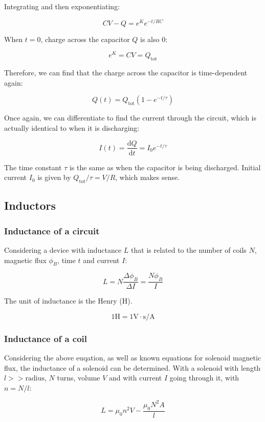 \documentclass[12pt]{article}
\begin{document}
Integrating and then exponentiating:

\[
\boxed{CV - Q = e^K e^{-t/RC}}
\]

When $t = 0$, charge across the capacitor $Q$ is also $0$:

\[
\boxed{e^K = CV = Q_{\text{tot}}}
\]

Therefore, we can find that the charge across the capacitor is time-dependent again:

\[
\boxed{ Q(t) = Q_{\text{tot}}(1 - e^{-t/\tau}) }
\]

Once again, we can differentiate to find the current through the circuit, which is actually identical to when it is discharging:

\[
\boxed{ I(t) = \frac{\mathrm{d}Q}{\mathrm{d}t} = I_0 e^{-t/ \tau} }
\]

The time constant $\tau$ is the same as when the capacitor is being discharged.
Initial current $I_0$ is given by $Q_{\text{tot}}/\tau = V/R$, which makes sense.


\subsection{Inductors}

\subsubsection{Inductance of a circuit}

Considering a device with inductance $L$ that is related to the number of coils $N$, magnetic flux $\phi_B$, time $t$ and current $I$:

\[
\boxed{
L = N\frac{\Delta \phi_B}{\Delta I} = \frac{N\phi_B}{I}
}
\]

The unit of inductance is the Henry (H).

\[
\boxed{
1 \text{H} = 1\text{V} \cdot \text{s}/\text{A}
}
\]

\subsubsection{Inductance of a coil}

Considering the above euqation, as well as known equations for solenoid magnetic flux, the inductance of a solenoid can be determined.
With a solenoid with length $l >> \text{radius}$, $N$ turns, volume $V$ and with current $I$ going through it, with $n = N/l$:

\[
\boxed{
L = \mu_0 n^2 V - \frac{\mu_0 N^2 A}{l}
}
\]
\end{document}
